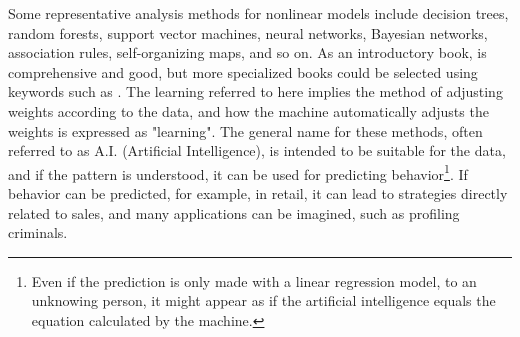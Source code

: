 \documentclass{ltjsbook}
\begin{document}
Some representative analysis methods for nonlinear models include decision trees, random forests, support vector machines, neural networks, Bayesian networks, association rules, self-organizing maps, and so on. As an introductory book, \textcite{Toyoda2008} is comprehensive and good, but more specialized books could be selected using keywords such as . The learning referred to here implies the method of adjusting weights according to the data, and how the machine automatically adjusts the weights is expressed as "learning". The general name for these methods, often referred to as A.I. (Artificial Intelligence), is intended to be suitable for the data, and if the pattern is understood, it can be used for predicting behavior\footnote{Even if the prediction is only made with a linear regression model, to an unknowing person, it might appear as if the artificial intelligence equals the equation calculated by the machine.}. If behavior can be predicted, for example, in retail, it can lead to strategies directly related to sales, and many applications can be imagined, such as profiling criminals.
\end{document}
